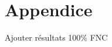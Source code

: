 \documentclass[11pt,a4paper,oldfontcommands]{memoir}
\begin{document}
\appendix

\chapter{Appendice}
 {\color{red} Ajouter résultats 100\% FNC}



\end{document}
